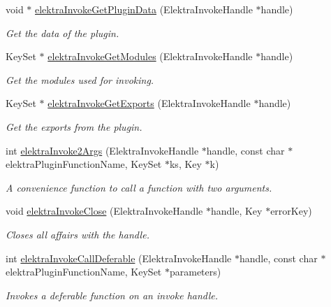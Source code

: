 \begin{DoxyCompactItemize}
void $\ast$ \hyperlink{group__invoke_gac615e211a4d3c77addfa18152c274345}{elektra\+Invoke\+Get\+Plugin\+Data} (Elektra\+Invoke\+Handle $\ast$handle)
\begin{DoxyCompactList}\small\item\em Get the data of the plugin. \end{DoxyCompactList}\item 
Key\+Set $\ast$ \hyperlink{group__invoke_gaf3564011b52e96c9754a7b9bc41ea478}{elektra\+Invoke\+Get\+Modules} (Elektra\+Invoke\+Handle $\ast$handle)
\begin{DoxyCompactList}\small\item\em Get the modules used for invoking. \end{DoxyCompactList}\item 
Key\+Set $\ast$ \hyperlink{group__invoke_ga6ab386aba337d8d3fd7978070d613efe}{elektra\+Invoke\+Get\+Exports} (Elektra\+Invoke\+Handle $\ast$handle)
\begin{DoxyCompactList}\small\item\em Get the exports from the plugin. \end{DoxyCompactList}\item 
int \hyperlink{group__invoke_gaa257d93399c60f73c611205bbfa7c9a0}{elektra\+Invoke2\+Args} (Elektra\+Invoke\+Handle $\ast$handle, const char $\ast$elektra\+Plugin\+Function\+Name, Key\+Set $\ast$ks, Key $\ast$k)
\begin{DoxyCompactList}\small\item\em A convenience function to call a function with two arguments. \end{DoxyCompactList}\item 
void \hyperlink{group__invoke_ga684a21daa0b3c20783c55184a9157b3b}{elektra\+Invoke\+Close} (Elektra\+Invoke\+Handle $\ast$handle, Key $\ast$error\+Key)
\begin{DoxyCompactList}\small\item\em Closes all affairs with the handle. \end{DoxyCompactList}\item 
int \hyperlink{group__invoke_ga0c1fe2bab1f3a465106d6585363787a1}{elektra\+Invoke\+Call\+Deferable} (Elektra\+Invoke\+Handle $\ast$handle, const char $\ast$elektra\+Plugin\+Function\+Name, Key\+Set $\ast$parameters)
\begin{DoxyCompactList}\small\item\em Invokes a deferable function on an invoke handle. \end{DoxyCompactList}\item 

\end{DoxyCompactItemize}
